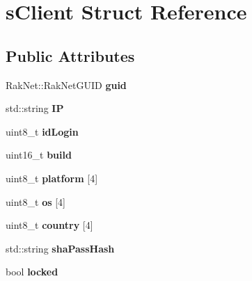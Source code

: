 \hypertarget{structs_client}{\section{s\-Client Struct Reference}
\label{structs_client}
}
\subsection*{Public Attributes}
\begin{DoxyCompactItemize}
\item 
\hypertarget{structs_client_ab4849ce49ae9fa878b936fc9b17af9fb}{Rak\-Net\-::\-Rak\-Net\-G\-U\-I\-D {\bfseries guid}}\label{structs_client_ab4849ce49ae9fa878b936fc9b17af9fb}

\item 
\hypertarget{structs_client_aae6ab1aec404efbb265c1618d8c7ae42}{std\-::string {\bfseries I\-P}}\label{structs_client_aae6ab1aec404efbb265c1618d8c7ae42}

\item 
\hypertarget{structs_client_a09009c72102e0e0ea5cc39849d116604}{uint8\-\_\-t {\bfseries id\-Login}}\label{structs_client_a09009c72102e0e0ea5cc39849d116604}

\item 
\hypertarget{structs_client_af0e07b836beaa949763b3b2b9ca395ed}{uint16\-\_\-t {\bfseries build}}\label{structs_client_af0e07b836beaa949763b3b2b9ca395ed}

\item 
\hypertarget{structs_client_aa69292659688e571b65e4f491e498e24}{uint8\-\_\-t {\bfseries platform} \mbox{[}4\mbox{]}}\label{structs_client_aa69292659688e571b65e4f491e498e24}

\item 
\hypertarget{structs_client_ae88544f15ff0ec91b16a32a080eaab71}{uint8\-\_\-t {\bfseries os} \mbox{[}4\mbox{]}}\label{structs_client_ae88544f15ff0ec91b16a32a080eaab71}

\item 
\hypertarget{structs_client_a9e109cdf30aa657fdab8c2dd2eec2a6d}{uint8\-\_\-t {\bfseries country} \mbox{[}4\mbox{]}}\label{structs_client_a9e109cdf30aa657fdab8c2dd2eec2a6d}

\item 
\hypertarget{structs_client_a27aac8797df9b3babb3010e3b404ef6a}{std\-::string {\bfseries sha\-Pass\-Hash}}\label{structs_client_a27aac8797df9b3babb3010e3b404ef6a}

\item 
\hypertarget{structs_client_aeee1d58377697aa317bfaeecd32bc42c}{bool {\bfseries locked}}\label{structs_client_aeee1d58377697aa317bfaeecd32bc42c}


\end{DoxyCompactItemize}
